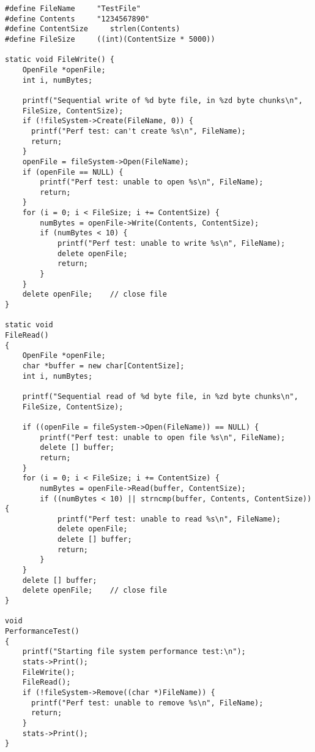 \documentclass[a4paper,10pt]{article}
\begin{document}
\begin{lstlisting}
#define FileName     "TestFile"
#define Contents     "1234567890"
#define ContentSize     strlen(Contents)
#define FileSize     ((int)(ContentSize * 5000))

static void FileWrite() {
    OpenFile *openFile;
    int i, numBytes;

    printf("Sequential write of %d byte file, in %zd byte chunks\n",
    FileSize, ContentSize);
    if (!fileSystem->Create(FileName, 0)) {
      printf("Perf test: can't create %s\n", FileName);
      return;
    }
    openFile = fileSystem->Open(FileName);
    if (openFile == NULL) {
        printf("Perf test: unable to open %s\n", FileName);
        return;
    }
    for (i = 0; i < FileSize; i += ContentSize) {
        numBytes = openFile->Write(Contents, ContentSize);
        if (numBytes < 10) {
            printf("Perf test: unable to write %s\n", FileName);
            delete openFile;
            return;
        }
    }
    delete openFile;    // close file
}

static void
FileRead()
{
    OpenFile *openFile;
    char *buffer = new char[ContentSize];
    int i, numBytes;

    printf("Sequential read of %d byte file, in %zd byte chunks\n",
    FileSize, ContentSize);

    if ((openFile = fileSystem->Open(FileName)) == NULL) {
        printf("Perf test: unable to open file %s\n", FileName);
        delete [] buffer;
        return;
    }
    for (i = 0; i < FileSize; i += ContentSize) {
        numBytes = openFile->Read(buffer, ContentSize);
        if ((numBytes < 10) || strncmp(buffer, Contents, ContentSize)) {
            printf("Perf test: unable to read %s\n", FileName);
            delete openFile;
            delete [] buffer;
            return;
        }
    }
    delete [] buffer;
    delete openFile;    // close file
}

void
PerformanceTest()
{
    printf("Starting file system performance test:\n");
    stats->Print();
    FileWrite();
    FileRead();
    if (!fileSystem->Remove((char *)FileName)) {
      printf("Perf test: unable to remove %s\n", FileName);
      return;
    }
    stats->Print();
}
\end{lstlisting}
\end{document}
